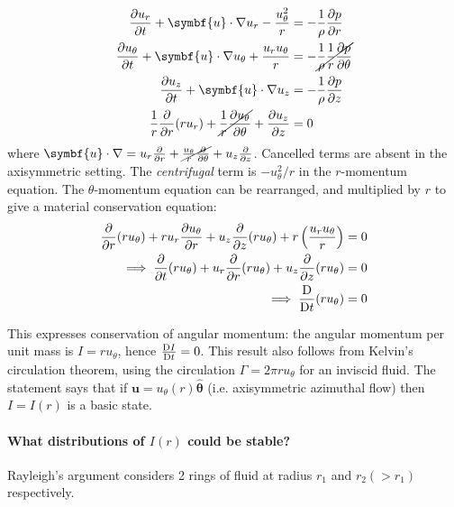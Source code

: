 \documentclass{jknotes}
\renewcommand{\u}{\symbf{u}}
\begin{document}
\begin{align}
	\frac{\partial u_r}{\partial t} + \u \cdot \nabla u_r -
	\frac{u_\theta^2}{r} &= - \frac{1}{\rho}\frac{\partial p}{\partial r} \\
	\frac{\partial u_\theta}{\partial t} + \u \cdot \nabla u_\theta +
	\frac{u_r u_\theta}{r} &= - \cancel{\frac{1}{\rho}\frac{1}{r}\frac{\partial
p}{\partial \theta}} \\
	\frac{\partial u_z}{\partial t} + \u \cdot \nabla u_z
	 &= - \frac{1}{\rho}\frac{\partial p}{\partial z} \\
	 \frac{1}{r}\frac{\partial}{\partial r}(ru_r) +
	 \cancel{\frac{1}{r}\frac{\partial u_\theta}{\partial \theta}} +
			\frac{\partial u_z}{\partial z} &= 0 
\end{align}
where $\u \cdot \nabla = u_r \frac{\partial}{\partial r} + \cancel{
\frac{u_\theta}{r}\frac{\partial}{\partial \theta}} + u_z
\frac{\partial}{\partial z}$. Cancelled terms are absent in the axisymmetric
setting. The \emph{centrifugal} term is $-u_\theta^2/r$ in the $r$-momentum
equation. The $\theta$-momentum equation can be rearranged, and multiplied by
$r$ to give a material conservation equation:
\begin{align}
	\frac{\partial}{\partial r} (ru_\theta) + r u_r \frac{\partial
	u_\theta}{\partial r} + u_z \frac{\partial}{\partial z} (ru_\theta) +
	r\left(\frac{u_r u_\theta}{r}\right) &= 0 \\
	\implies \frac{\partial}{\partial t} (ru_\theta) + u_r
	\frac{\partial}{\partial r}(ru_\theta) + u_z \frac{\partial}{\partial
z}(ru_\theta) &= 0  \\
\implies \frac{\mathrm{D}}{\mathrm{D} t} (ru_\theta) &= 0
\end{align}

This expresses conservation of angular momentum: the angular momentum per unit
mass is $I = ru_\theta$, hence $\frac{\mathrm{D} I}{\mathrm{D} t} = 0$. This result
also follows from Kelvin's circulation theorem, using the circulation $\Gamma
= 2\pi r u_\theta$ for an inviscid fluid. The statement says that if $\u =
u_\theta(r)\hat{\symbf{\theta}}$ (i.e. axisymmetric azimuthal flow) then $I =
I(r)$ is a basic state.


\paragraph{What distributions of $I(r)$ could be stable?}
Rayleigh's argument considers 2 rings of fluid at radius $r_1$ and $r_2 (>
r_1)$ respectively. 
\begin{center}
\end{center}
\end{document}
